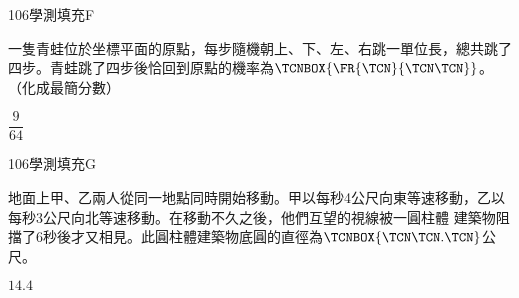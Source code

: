 \begin{QUESTIONS}
\begin{QUESTION}
\begin{ExamInfo}{106}{學測}{填充}{F}
        \end{ExamInfo}
        \begin{ExamAnsRateInfo}{19}{45}{11}{1}
        \end{ExamAnsRateInfo}
        \begin{QBODY}
            一隻青蛙位於坐標平面的原點，每步隨機朝上、下、左、右跳一單位長，總共跳了四步。青蛙跳了四步後恰回到原點的機率為$\TCNBOX{\FR{\TCN}{\TCN\TCN}}$。（化成最簡分數）
        \end{QBODY}
        \begin{QFROMS}
        \end{QFROMS}
        \begin{QTAGS}\end{QTAGS}
        \begin{QANS}
            $\dfrac{9}{64}$
        \end{QANS}
        \begin{QSOLLIST}
        \end{QSOLLIST}
        \begin{QEMPTYSPACE}
        \end{QEMPTYSPACE}
    \end{QUESTION}
    \begin{QUESTION}
        \begin{ExamInfo}{106}{學測}{填充}{G}
        \end{ExamInfo}
        \begin{ExamAnsRateInfo}{22}{56}{9}{1}
        \end{ExamAnsRateInfo}
        \begin{QBODY}
            地面上甲、乙兩人從同一地點同時開始移動。甲以每秒4公尺向東等速移動，乙以每秒3公尺向北等速移動。在移動不久之後，他們互望的視線被一圓柱體 建築物阻擋了6秒後才又相見。此圓柱體建築物底圓的直徑為$\TCNBOX{\TCN\TCN.\TCN}$公尺。
        \end{QBODY}
        \begin{QFROMS}
        \end{QFROMS}
        \begin{QTAGS}\end{QTAGS}
        \begin{QANS}
            $14.4$
        \end{QANS}
        \begin{QSOLLIST}
        \end{QSOLLIST}
        \begin{QEMPTYSPACE}
        \end{QEMPTYSPACE}
    \end{QUESTION}
\end{QUESTIONS}

